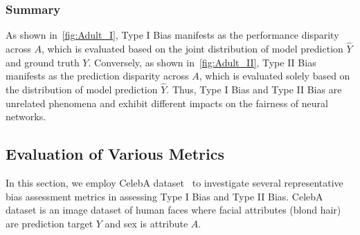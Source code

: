 \subsubsection{Summary}
As shown in~\cref{fig:Adult_I}, Type I Bias manifests as the performance disparity across $A$, which is evaluated based on the joint distribution of model prediction $\hat{Y}$ and ground truth $Y$.
Conversely, as shown in~\cref{fig:Adult_II}, Type II Bias manifests as the prediction disparity across $A$, which is evaluated solely based on the distribution of model prediction $\hat{Y}$.
Thus, Type I Bias and Type II Bias are unrelated phenomena and exhibit different impacts on the fairness of neural networks.
















\subsection{Evaluation of Various Metrics}
In this section, we employ CelebA dataset~\cite{CelebA} to investigate several representative bias assessment metrics in assessing Type I Bias and Type II Bias. 
CelebA dataset is an image dataset of human faces where facial attributes (\eg blond hair) are prediction target $Y$ and sex is attribute $A$.




